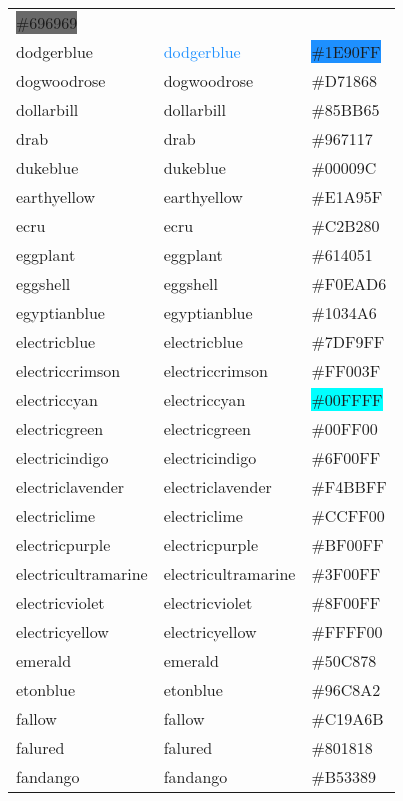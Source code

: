 \documentclass[
]{article}
\begin{document}
\begin{longtable}[]{@{}lll@{}}
\colorbox{dimgray}{\#696969}\tabularnewline
dodgerblue & \textcolor{dodgerblue}{dodgerblue} &
\colorbox{dodgerblue}{\#1E90FF}\tabularnewline
dogwoodrose & \textcolor{dogwoodrose}{dogwoodrose} &
\colorbox{dogwoodrose}{\#D71868}\tabularnewline
dollarbill & \textcolor{dollarbill}{dollarbill} &
\colorbox{dollarbill}{\#85BB65}\tabularnewline
drab & \textcolor{drab}{drab} & \colorbox{drab}{\#967117}\tabularnewline
dukeblue & \textcolor{dukeblue}{dukeblue} &
\colorbox{dukeblue}{\#00009C}\tabularnewline
earthyellow & \textcolor{earthyellow}{earthyellow} &
\colorbox{earthyellow}{\#E1A95F}\tabularnewline
ecru & \textcolor{ecru}{ecru} &
\colorbox{darkchampagne}{\#C2B280}\tabularnewline
eggplant & \textcolor{eggplant}{eggplant} &
\colorbox{eggplant}{\#614051}\tabularnewline
eggshell & \textcolor{eggshell}{eggshell} &
\colorbox{eggshell}{\#F0EAD6}\tabularnewline
egyptianblue & \textcolor{egyptianblue}{egyptianblue} &
\colorbox{egyptianblue}{\#1034A6}\tabularnewline
electricblue & \textcolor{electricblue}{electricblue} &
\colorbox{electricblue}{\#7DF9FF}\tabularnewline
electriccrimson & \textcolor{electriccrimson}{electriccrimson} &
\colorbox{electriccrimson}{\#FF003F}\tabularnewline
electriccyan & \textcolor{electriccyan}{electriccyan} &
\colorbox{aqua}{\#00FFFF}\tabularnewline
electricgreen & \textcolor{electricgreen}{electricgreen} &
\colorbox{electricgreen}{\#00FF00}\tabularnewline
electricindigo & \textcolor{electricindigo}{electricindigo} &
\colorbox{electricindigo}{\#6F00FF}\tabularnewline
electriclavender & \textcolor{electriclavender}{electriclavender} &
\colorbox{brilliantlavender}{\#F4BBFF}\tabularnewline
electriclime & \textcolor{electriclime}{electriclime} &
\colorbox{electriclime}{\#CCFF00}\tabularnewline
electricpurple & \textcolor{electricpurple}{electricpurple} &
\colorbox{electricpurple}{\#BF00FF}\tabularnewline
electricultramarine &
\textcolor{electricultramarine}{electricultramarine} &
\colorbox{electricultramarine}{\#3F00FF}\tabularnewline
electricviolet & \textcolor{electricviolet}{electricviolet} &
\colorbox{electricviolet}{\#8F00FF}\tabularnewline
electricyellow & \textcolor{electricyellow}{electricyellow} &
\colorbox{electricyellow}{\#FFFF00}\tabularnewline
emerald & \textcolor{emerald}{emerald} &
\colorbox{emerald}{\#50C878}\tabularnewline
etonblue & \textcolor{etonblue}{etonblue} &
\colorbox{etonblue}{\#96C8A2}\tabularnewline
fallow & \textcolor{fallow}{fallow} &
\colorbox{camel}{\#C19A6B}\tabularnewline
falured & \textcolor{falured}{falured} &
\colorbox{falured}{\#801818}\tabularnewline
fandango & \textcolor{fandango}{fandango} &
\colorbox{fandango}{\#B53389}\tabularnewline

\end{longtable}
\end{document}

